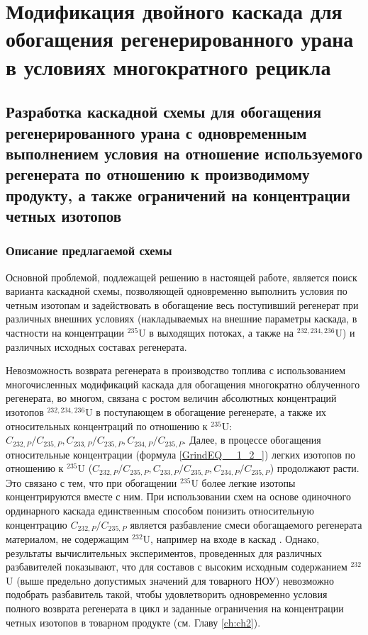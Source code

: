 \chapter{Модификация двойного каскада для обогащения регенерированного урана в условиях многократного рецикла}\label{ch:ch3}

\section{Разработка каскадной схемы для обогащения регенерированного урана с одновременным выполнением условия на отношение используемого регенерата по отношению к производимому продукту, а также ограничений на концентрации четных изотопов}
\subsection{Описание предлагаемой схемы}\label{triple_descr}

Основной проблемой, подлежащей решению в настоящей работе, является поиск варианта каскадной схемы, позволяющей одновременно выполнить условия по четным изотопам и задействовать в обогащение весь поступивший регенерат при различных внешних условиях (накладываемых на внешние параметры каскада, в частности на концентрации $^{235}$U в выходящих потоках, а также на $^{232,234,236}$U) и различных исходных составах регенерата.

Невозможность возврата регенерата в производство топлива с использованием многочисленных модификаций каскада для обогащения многократно облученного регенерата, во многом, связана с ростом величин абсолютных концентраций изотопов $^{232,234,236}$U в поступающем в обогащение регенерате, а также их относительных концентраций по отношению к $^{235}$U:  ${C_{232,{P}}}/{C_{235,{P}}},{C_{233,{P}}}/{C_{235,{P}}},{C_{234,{P}}}/{C_{235,{P}}}$. Далее, в процессе обогащения относительные концентрации (формула \ref{GrindEQ__1_2_}) легких изотопов по отношению к $^{235}$U (${C_{232,{P}}}/{C_{235,{P}}},{C_{233,{P}}}/{C_{235,{P}}},{C_{234,{P}}}/{C_{235,{P}}}$) продолжают расти. Это связано с тем, что при обогащении $^{235}$U более легкие изотопы концентрируются вместе с ним. При использовании схем на основе одиночного ординарного каскада единственным способом понизить относительную концентрацию ${C_{232,{P}}}/{C_{235,{P}}}$ является разбавление смеси обогащаемого регенерата материалом, не содержащим $^{232}$U, например на входе в каскад \cite{smirnovKaskadnyeShemyZadachah2012}. Однако, результаты вычислительных экспериментов, проведенных для различных разбавителей показывают, что для составов с высоким исходным содержанием $^{232}$U (выше предельно допустимых значений для товарного НОУ) невозможно подобрать разбавитель такой, чтобы удовлетворить одновременно условия полного возврата регенерата в цикл и заданные ограничения на концентрации четных изотопов в товарном продукте (см. Главу \ref{ch:ch2}). 


